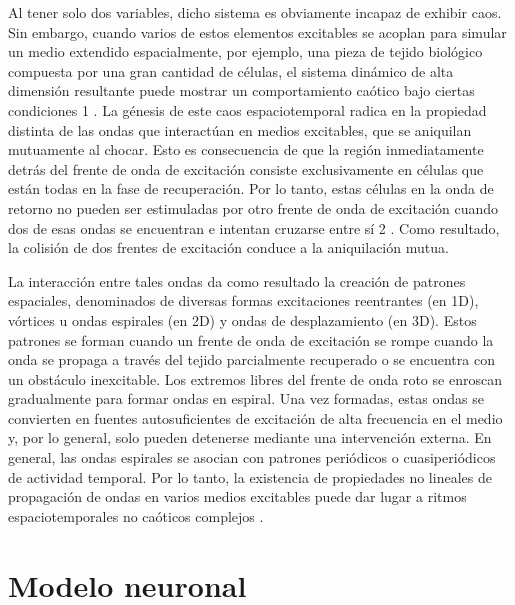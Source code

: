 Al tener solo dos variables, dicho sistema es obviamente incapaz de exhibir caos. Sin embargo, cuando varios de estos elementos excitables se acoplan para simular un medio extendido espacialmente, por ejemplo, una pieza de tejido biológico compuesta por una gran cantidad de células, el sistema dinámico de alta dimensión resultante puede mostrar un comportamiento caótico bajo ciertas condiciones 1 . La génesis de este caos espaciotemporal radica en la propiedad distinta de las ondas que interactúan en medios excitables, que se aniquilan mutuamente al chocar. Esto es consecuencia de que la región inmediatamente detrás del frente de onda de excitación consiste exclusivamente en células que están todas en la fase de recuperación. Por lo tanto, estas células en la onda de retorno no pueden ser estimuladas por otro frente de onda de excitación cuando dos de esas ondas se encuentran e intentan cruzarse entre sí 2 . Como resultado, la colisión de dos frentes de excitación conduce a la aniquilación mutua.


La interacción entre tales ondas da como resultado la creación de patrones espaciales, denominados de diversas formas excitaciones reentrantes (en 1D), vórtices u ondas espirales (en 2D) y ondas de desplazamiento (en 3D). Estos patrones se forman cuando un frente de onda de excitación se rompe cuando la onda se propaga a través del tejido parcialmente recuperado o se encuentra con un obstáculo inexcitable. Los extremos libres del frente de onda roto se enroscan gradualmente para formar ondas en espiral. Una vez formadas, estas ondas se convierten en fuentes autosuficientes de excitación de alta frecuencia en el medio y, por lo general, solo pueden detenerse mediante una intervención externa. En general, las ondas espirales se asocian con patrones periódicos o cuasiperiódicos de actividad temporal. Por lo tanto, la existencia de propiedades no lineales de propagación de ondas en varios medios excitables puede dar lugar a ritmos espaciotemporales no caóticos complejos \cite{tesis_Sridhar}.












\section{Modelo neuronal}\label{sec:modelo_dinamica_neuronal}

